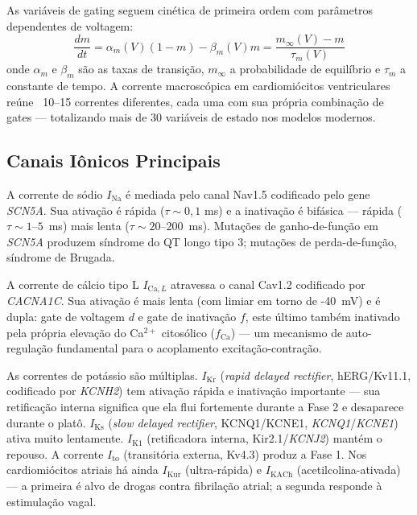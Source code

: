 As variáveis de gating seguem cinética de primeira ordem com parâmetros
dependentes de voltagem:
\begin{equation}
\frac{dm}{dt} = \alpha_m(V)(1 - m) - \beta_m(V) m
            = \frac{m_\infty(V) - m}{\tau_m(V)}
\end{equation}
onde $\alpha_m$ e $\beta_m$ são as taxas de transição, $m_\infty$ a
probabilidade de equilíbrio e $\tau_m$ a constante de tempo. A corrente
macroscópica em cardiomiócitos ventriculares reúne ~10--15 correntes
diferentes, cada uma com sua própria combinação de gates --- totalizando
mais de 30 variáveis de estado nos modelos modernos.

\subsection{Canais Iônicos Principais}
\label{sub:image12-canais}

A corrente de sódio $I_{\mathrm{Na}}$ é mediada pelo canal Nav1.5
codificado pelo gene \textit{SCN5A}. Sua ativação é rápida ($\tau \sim
0{,}1$ ms) e a inativação é bifásica --- rápida ($\tau \sim 1$--$5$~ms)
mais lenta ($\tau \sim 20$--$200$~ms). Mutações de ganho-de-função em
\textit{SCN5A} produzem síndrome do QT longo tipo 3; mutações de
perda-de-função, síndrome de Brugada.

A corrente de cálcio tipo L $I_{\mathrm{Ca},L}$ atravessa o canal Cav1.2
codificado por \textit{CACNA1C}. Sua ativação é mais lenta (com limiar
em torno de -40~mV) e é dupla: gate de voltagem $d$ e gate de
inativação $f$, este último também inativado pela própria elevação do
Ca$^{2+}$ citosólico ($f_{\mathrm{Ca}}$) --- um mecanismo de
auto-regulação fundamental para o acoplamento excitação-contração.

As correntes de potássio são múltiplas. $I_{\mathrm{Kr}}$ (\emph{rapid
delayed rectifier}, hERG/Kv11.1, codificado por \textit{KCNH2}) tem
ativação rápida e inativação importante --- sua retificação interna
significa que ela flui fortemente durante a Fase 2 e desaparece durante
o platô. $I_{\mathrm{Ks}}$ (\emph{slow delayed rectifier}, KCNQ1/KCNE1,
\textit{KCNQ1}/\textit{KCNE1}) ativa muito lentamente. $I_{\mathrm{K1}}$
(retificadora interna, Kir2.1/\textit{KCNJ2}) mantém o repouso.
A corrente $I_{\mathrm{to}}$ (transitória externa, Kv4.3) produz a
Fase 1. Nos cardiomiócitos atriais há ainda $I_{\mathrm{Kur}}$ (ultra-rápida)
e $I_{\mathrm{KACh}}$ (acetilcolina-ativada) --- a primeira é alvo de
drogas contra fibrilação atrial; a segunda responde à estimulação vagal.

